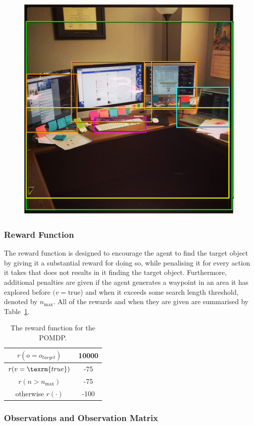 \documentclass[runningheads]{llncs}
\begin{document}
\begin{figure}
  \centering
  \includegraphics[width=0.5\columnwidth]{figures/desk_example.png}
  \caption{}\label{fig:openimage}
\end{figure}

\subsubsection{Reward Function}

The reward function is designed to encourage the agent to find the target object by giving it a substantial reward for doing so, while penalising it for every action it takes that does not results in it finding the target object.
Furthermore, additional penalties are given if the agent generates a waypoint in an area it has explored before $(v = \textrm{true}$) and when it exceeds some search length threshold, denoted by $n_{\max}$.
All of the rewards and when they are given are summarised by Table~\ref{tab:rewards}.

\begin{table}
  \centering
  \caption{The reward function for the POMDP. }\label{tab:rewards}
  \begin{tabular}{cc}
    \toprule
    $r(o = o_{target})$ & 10000 \\ \midrule
    $r(v = \texrm{true})$  & -75 \\ \midrule
    $r(n > n_{\max})$ & -75 \\ \midrule
    otherwise $r(\cdot)$ & -100  \\ \midrule
    \bottomrule
  \end{tabular}
\end{table}

\subsubsection{Observations and Observation Matrix}
\end{document}
